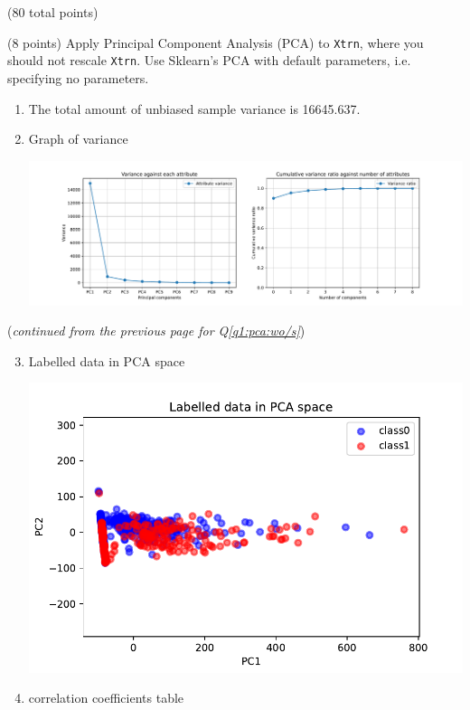 \documentclass[12pt]{article}
\begin{document}
\begin{question}{(80 total points) \qOneTitle}
\begin{subquestion}{(8 points)
    Apply Principal Component Analysis (PCA) to {\tt Xtrn}, where you should not rescale {\tt Xtrn}.
    Use Sklearn's PCA with default parameters, i.e. specifying no parameters.
  }
  \begin{answerbox}{0.5\textheight}
    \begin{enumerate}
    \item The total amount of unbiased sample variance is 16645.637.
    \item Graph of variance
        \begin{center}
             \includegraphics[scale=0.47]{variance2.pdf}
        \end{center}
    \end{enumerate}
  \end{answerbox}
  \clearpage
  ({\it continued from the previous page for Q\ref{q1:pca:wo/s}})
  \begin{answerbox}{0.6\textheight}
    \begin{enumerate}\setcounter{enumi}{2}
    \item Labelled data in PCA space
        \begin{center}
             \includegraphics[scale=1.0]{PCA.pdf}
        \end{center}
    \item correlation coefficients table
    \begin{center}
        \begin{tabular}{c|c|c|c|c|c|c|c|c|c} \hline

\end{tabular}
\end{center}
\end{enumerate}
\end{answerbox}
\end{subquestion}
\end{question}
\end{document}

